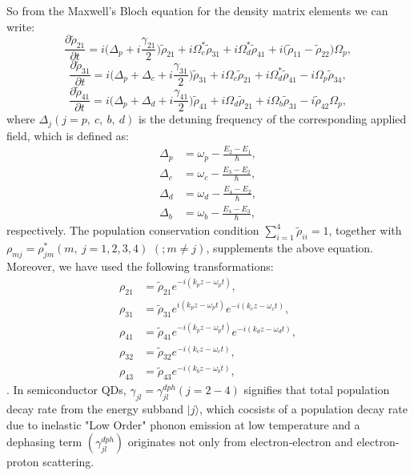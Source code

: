 \documentclass[12pt,a4paper]{article}
\begin{document}
So from the Maxwell's Bloch equation for the density matrix elements we can write:
\begin{equation}
    \frac{\partial\tilde\rho_{21}}{\partial t} = i\big(\Delta_p+i\frac{\gamma_{21}}{2}\big)\tilde{\rho}_{21}+i\Omega_c^*\tilde{\rho}_{31}+i\Omega_d^*\tilde{\rho}_{41}+i\big(\tilde{\rho}_{11}-\tilde{\rho}_{22}\big)\Omega_p,
\end{equation}
\begin{equation}
    \frac{\partial\tilde{\rho}_{31}}{\partial t}=i\big(\Delta_p+\Delta_c+i\frac{\gamma_{31}}{2}\big)\tilde{\rho}_{31}+i\Omega_c\tilde{\rho}_{21}+i\Omega_d^*\tilde{\rho}_{41}-i\Omega_p\tilde{\rho}_{34},
\end{equation}
\begin{equation}
    \frac{\partial\tilde{\rho}_{41}}{\partial t}=i\big(\Delta_p+\Delta_d+i\frac{\gamma_{41}}{2}\big)\tilde{\rho}_{41}+i\Omega_d\tilde{\rho}_{21}+i\Omega_b\tilde{\rho}_{31}-i\tilde{\rho}_{42}\Omega_p,
\end{equation}
where $\Delta_j{(j=p,\ c,\ b,\ d)}$ is the detuning frequency of the corresponding applied field, which is defined as:
\begin{align}
\Delta_p &= \omega_{p}-\frac{E_2-E_1}{\hbar},\\
\Delta_c &= \omega_{c}-\frac{E_3-E_2}{\hbar},\\
\Delta_d &= \omega_{d}-\frac{E_4-E_2}{\hbar},\\
\Delta_b &= \omega_{b}-\frac{E_4-E_3}{\hbar},
\end{align}
respectively. The population conservation condition \(\sum_{i=1}^{4} \tilde\rho_{ii} = 1\), together with $\rho_{mj} = \rho_{jm}^*{(m,\ j=1,2,3,4)}$ ${(;m\neq j)}$, supplements the above equation. Moreover, we have used the following transformations:
\begin{align}
    \rho_{21} &= \tilde\rho_{21}e^{-i(k_p z-\omega_p t)},\\
    \rho_{31} &= \tilde\rho_{31}e^{i(k_p z-\omega_p t)}e^{-i(k_c z-\omega_c t)},\\
    \rho_{41} &= \tilde\rho_{41}e^{-i(k_p z-\omega_p t)}e^{-i(k_d z-\omega_d t)},\\
    \rho_{32} &= \tilde\rho_{32}e^{-i(k_c z-\omega_c t)},\\
    \rho_{43} &= \tilde\rho_{43}e^{-i(k_b z-\omega_b t)},
\end{align}.
In semiconductor QDs, $\gamma_{jl} = \gamma^{dph}_{jl}{(j=2-4)}$ signifies that total population decay rate from the energy subband $|j\rangle$, which cocsists of a population decay rate  due to inelastic "Low Order" phonon emission at low temperature and a dephasing term $\left(\gamma^{dph}_{jl}\right)$ originates not only from electron-electron and electron-proton scattering.\par
\end{document}
